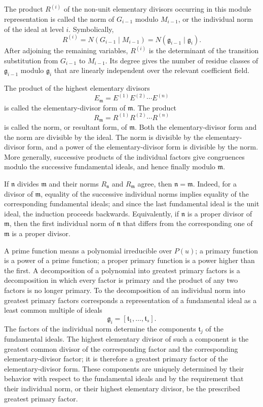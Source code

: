 \documentclass[11pt]{article}
\begin{document}
The product $R^{(i)}$ of the non-unit elementary divisors occurring in this module representation is called the norm of $G_{i-1}$ modulo $M_{i-1}$, or the individual norm of the ideal at level $i$. Symbolically,
\[
  R^{(i)}=N(G_{i-1}\mid M_{i-1})=N(\mathfrak g_{i-1}\mid \mathfrak g_i).
\]
After adjoining the remaining variables, $R^{(i)}$ is the determinant of the transition substitution from $G_{i-1}$ to $M_{i-1}$. Its degree gives the number of residue classes of $\mathfrak g_{i-1}$ modulo $\mathfrak g_i$ that are linearly independent over the relevant coefficient field.

The product of the highest elementary divisors
\[
  E_{\mathfrak m}=E^{(1)}E^{(2)}\cdots E^{(n)}
\]
is called the elementary-divisor form of $\mathfrak m$. The product
\[
  R_{\mathfrak m}=R^{(1)}R^{(2)}\cdots R^{(n)}
\]
is called the norm, or resultant form, of $\mathfrak m$. Both the elementary-divisor form and the norm are divisible by the ideal. The norm is divisible by the elementary-divisor form, and a power of the elementary-divisor form is divisible by the norm. More generally, successive products of the individual factors give congruences modulo the successive fundamental ideals, and hence finally modulo $\mathfrak m$.

If $\mathfrak n$ divides $\mathfrak m$ and their norms $R_{\mathfrak n}$ and $R_{\mathfrak m}$ agree, then $\mathfrak n=\mathfrak m$. Indeed, for a divisor of $\mathfrak m$, equality of the successive individual norms implies equality of the corresponding fundamental ideals; and since the last fundamental ideal is the unit ideal, the induction proceeds backwards. Equivalently, if $\mathfrak n$ is a proper divisor of $\mathfrak m$, then the first individual norm of $\mathfrak n$ that differs from the corresponding one of $\mathfrak m$ is a proper divisor.

A prime function means a polynomial irreducible over $P(u)$; a primary function is a power of a prime function; a proper primary function is a power higher than the first. A decomposition of a polynomial into greatest primary factors is a decomposition in which every factor is primary and the product of any two factors is no longer primary. To the decomposition of an individual norm into greatest primary factors corresponds a representation of a fundamental ideal as a least common multiple of ideals
\[
  \mathfrak g_i=[\mathfrak t_1,\ldots,\mathfrak t_s].
\]
The factors of the individual norm determine the components $\mathfrak t_j$ of the fundamental ideals. The highest elementary divisor of such a component is the greatest common divisor of the corresponding factor and the corresponding elementary-divisor factor; it is therefore a greatest primary factor of the elementary-divisor form. These components are uniquely determined by their behavior with respect to the fundamental ideals and by the requirement that their individual norm, or their highest elementary divisor, be the prescribed greatest primary factor.
\end{document}
